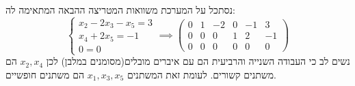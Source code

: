 \documentclass{tstextbook}
\begin{document}
\begin{example}
נסתכל על המערכת משוואות המטריצה ההבאה המתאימה לה:
$$\begin{cases}x_{2}-2x_{3}-x_{5}=3 \\x_{4}+2x_{5}=-1 \\0=0\end{cases}\implies\left(\begin{array}{ccccc|c}0&\boxed{1}&-2&0&-1 &3\\0&0&0&\boxed{1}&2 &-1\\0&0&0&0&0&0
\end{array}\right)$$
נשים לב כי העבודה השנייה והרביעית הם עם איברים מובלים(מסומנים במלבן) לכן \(x_{2},x_{4}\) הם משתנים קשורים. לעומת זאת המשתנים \(x_{1},x_3,x_{5}\) הם משתנים חופשיים.

\end{example}
\end{document}
